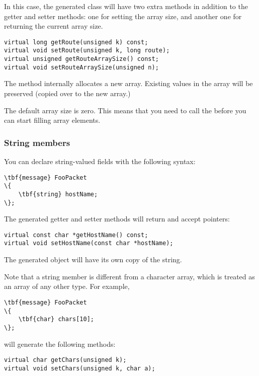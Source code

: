 In this case, the generated class will have two extra methods in addition
to the getter and setter methods: one for setting the array size, and another
one for returning the current array size.

\begin{verbatim}
virtual long getRoute(unsigned k) const;
virtual void setRoute(unsigned k, long route);
virtual unsigned getRouteArraySize() const;
virtual void setRouteArraySize(unsigned n);
\end{verbatim}

The  method internally allocates a new array. Existing
values in the array will be preserved (copied over to the new array.)

The default array size is zero. This means that you need to call the
 before you can start filling array elements.


\subsubsection{String members}

You can declare string-valued fields with the following syntax:

\begin{Verbatim}[commandchars=\\\{\}]
\tbf{message} FooPacket
\{
    \tbf{string} hostName;
\};
\end{Verbatim}

The generated getter and setter methods will return and accept 
pointers:

\begin{verbatim}
virtual const char *getHostName() const;
virtual void setHostName(const char *hostName);
\end{verbatim}

The generated object will have its own copy of the string.

Note that a string member is different from a character array,
which is treated as an array of any other type. For example,

\begin{Verbatim}[commandchars=\\\{\}]
\tbf{message} FooPacket
\{
    \tbf{char} chars[10];
\};
\end{Verbatim}

will generate the following methods:

\begin{verbatim}
virtual char getChars(unsigned k);
virtual void setChars(unsigned k, char a);
\end{verbatim}


